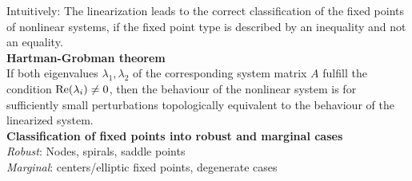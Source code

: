 Intuitively: The linearization leads to the correct classification of the fixed points of nonlinear systems, if the fixed point type is described by an inequality and not an equality.\\

\textbf{Hartman-Grobman theorem}\\
If both eigenvalues $\lambda_1, \lambda_2$ of the corresponding system matrix $A$ fulfill the condition $\textup{Re}(\lambda_i) \neq 0$, then the behaviour of the nonlinear system is for sufficiently small perturbations topologically equivalent to the behaviour of the linearized system.\\

\textbf{Classification of fixed points into robust and marginal cases}\\
\emph{Robust}: Nodes, spirals, saddle points\\
\emph{Marginal}: centers/elliptic fixed points, degenerate cases

